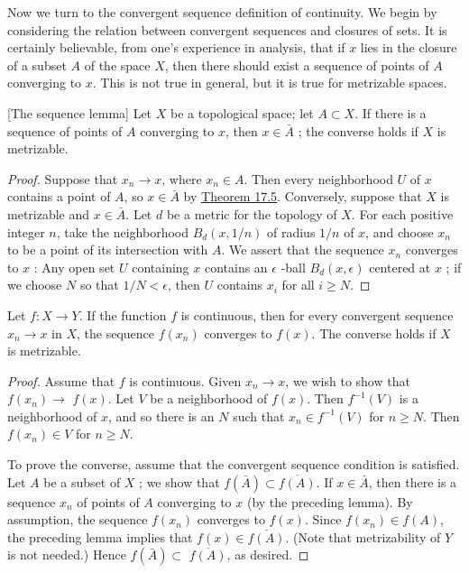 Now we turn to the convergent sequence definition of continuity. We begin by considering the relation between convergent sequences and closures of sets. It is certainly believable, from one's experience in analysis, that if \(x\) lies in the closure of a subset \(A\) of the space \(X\), then there should exist a sequence of points of \(A\) converging to \(x\). This is not true in general, but it is true for metrizable spaces.

\begin{lemma}
\label{lem:\thetheorem}[The sequence lemma]
 Let \(X\) be a topological space; let \(A \subset X\). If there is a sequence of points of \(A\) converging to \(x\), then \(x \in \bar{A}\) ; the converse holds if \(X\) is metrizable.
\end{lemma}

\begin{proof}
 Suppose that \(x_{n} \rightarrow x\), where \(x_{n} \in A\). Then every neighborhood \(U\) of \(x\) contains a point of \(A\), so \(x \in \bar{A}\) by \hyperref[thm:17.5]{Theorem 17.5}. Conversely, suppose that \(X\) is metrizable and \(x \in \bar{A}\). Let \(d\) be a metric for the topology of \(X\). For each positive integer \(n\), take the neighborhood \(B_{d}( {x,1/n})\) of radius \(1/n\) of \(x\), and choose \(x_{n}\) to be a point of its intersection with \(A\). We assert that the sequence \(x_{n}\) converges to \(x\) : Any open set \(U\) containing \(x\) contains an \(\epsilon\) -ball \(B_{d}( {x,\epsilon })\) centered at \(x\) ; if we choose \(N\) so that \(1/N < \epsilon\), then \(U\) contains \(x_{i}\) for all \(i \geq N\).
\end{proof}

\begin{theorem}
\label{thm:\thetheorem}
 Let \(f : X \rightarrow Y\). If the function \(f\) is continuous, then for every convergent sequence \(x_{n} \rightarrow x\) in \(X\), the sequence \(f( x_{n})\) converges to \(f(x)\). The converse holds if \(X\) is metrizable.

\end{theorem}
\begin{proof}
 Assume that \(f\) is continuous. Given \(x_{n} \rightarrow x\), we wish to show that \(f( x_{n}) \rightarrow\) \(f(x)\). Let \(V\) be a neighborhood of \(f(x)\). Then \(f^{-1}( V)\) is a neighborhood of \(x\), and so there is an \(N\) such that \(x_{n} \in {f}^{-1}( V)\) for \(n \geq N\). Then \(f( x_{n}) \in V\) for \(n \geq N\).

 To prove the converse, assume that the convergent sequence condition is satisfied. Let \(A\) be a subset of \(X\) ; we show that \(f( \bar{A}) \subset \overline{f( A) }\). If \(x \in \bar{A}\), then there is a sequence \(x_{n}\) of points of \(A\) converging to \(x\) (by the preceding lemma). By assumption, the sequence \(f( x_{n})\) converges to \(f(x)\). Since \(f( x_{n}) \in f( A)\), the preceding lemma implies that \(f(x) \in \overline{f( A) }\). (Note that metrizability of \(Y\) is not needed.) Hence \(f( \bar{A}) \subset\) \(\overline{f( A) }\), as desired.
\end{proof}

